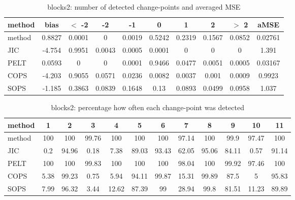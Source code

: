 \begin{table}[ht]
\centering
\begin{tabular}{l|c|ccccccc|c}
  \hline
method & bias & $<$ -2 & -2 & -1 & 0 & 1 & 2 & $>$ 2 & aMSE \\ 
  \hline
method & 0.8827 & 0.0001 &     0 & 0.0019 & 0.5242 & 0.2319 & 0.1567 & 0.0852 & 0.02761 \\ 
  JIC & -4.754 & 0.9951 & 0.0043 & 0.0005 & 0.0001 &     0 &     0 &     0 & 1.391 \\ 
  PELT & 0.0593 &     0 &     0 & 0.0001 & 0.9466 & 0.0477 & 0.0051 & 0.0005 & 0.03167 \\ 
  COPS & -4.203 & 0.9055 & 0.0571 & 0.0236 & 0.0082 & 0.0037 & 0.001 & 0.0009 & 0.9923 \\ 
  SOPS & -1.185 & 0.3863 & 0.0839 & 0.1648 &  0.13 & 0.0893 & 0.0499 & 0.0958 & 1.037 \\ 
   \hline
\end{tabular}
\caption{blocks2: number of detected change-points and averaged MSE} 
\label{tab:blocks2Njumps}
\end{table}
\begin{table}[ht]
\centering
\begin{tabular}{l|ccccccccccc}
  \hline
method & 1 & 2 & 3 & 4 & 5 & 6 & 7 & 8 & 9 & 10 & 11 \\ 
  \hline
method &    100 &    100 &  99.76 &    100 &    100 &    100 &  97.14 &    100 &   99.9 &  97.47 &    100 \\ 
  JIC &    0.2 &  94.96 &   0.18 &   7.38 &  89.03 &  93.43 &  62.05 &  95.06 &  84.11 &   0.57 &  91.14 \\ 
  PELT &    100 &    100 &  99.83 &    100 &    100 &    100 &  98.04 &    100 &  99.92 &  97.46 &    100 \\ 
  COPS &   5.38 &  99.23 &   0.75 &   5.94 &  94.11 &  99.87 &  15.31 &  99.89 &   87.5 &      5 &  95.83 \\ 
  SOPS &   7.99 &  96.32 &   3.44 &  12.62 &  87.39 &     99 &  28.94 &   99.8 &  81.51 &  11.23 &  89.89 \\ 
   \hline
\end{tabular}
\caption{blocks2: percentage how often each change-point was detected} 
\label{tab:blocks2Detections}
\end{table}
